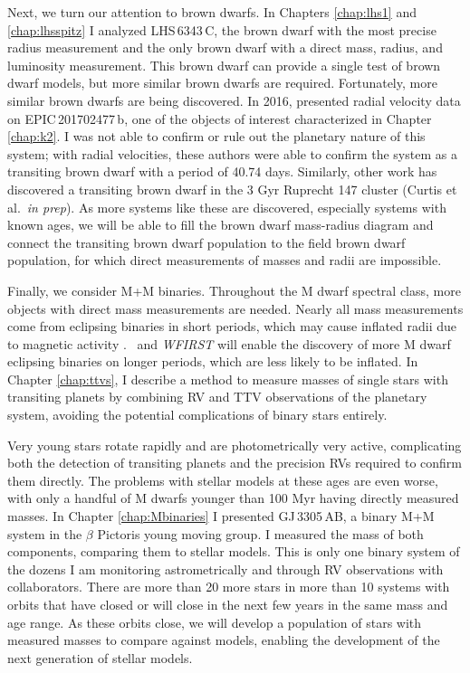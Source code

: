 Next, we turn our attention to brown dwarfs.
In Chapters \ref{chap:lhs1} and \ref{chap:lhsspitz} I analyzed LHS\,6343\,C, the
brown dwarf with the most precise radius measurement and the only brown dwarf with a
direct mass, radius, and luminosity measurement.
This brown dwarf can provide a single test of brown dwarf models, but more similar
brown dwarfs are required.
Fortunately, more similar brown dwarfs are being discovered. 
In 2016, \citet{Bayliss16} presented radial velocity data on EPIC\,201702477\,b,
one of the objects of interest characterized in Chapter \ref{chap:k2}. 
I was not able to confirm or rule out the planetary nature of this system;
with radial velocities, these authors were able to confirm the system as a transiting
brown dwarf with a period of 40.74 days.
Similarly, other work has discovered a transiting brown dwarf in the 3 Gyr Ruprecht 147
cluster (Curtis et al.\ \textit{in prep}). 
As more systems like these are discovered, especially systems with known ages, 
we will be able to fill the brown dwarf mass-radius diagram and connect the transiting
brown dwarf population to the field brown dwarf population, for which direct measurements
of masses and radii are impossible.


Finally, we consider M+M binaries. 
Throughout the M dwarf spectral class, more objects with direct mass measurements are
needed.
Nearly all mass measurements come from eclipsing binaries in short periods, which may
cause inflated radii due to magnetic activity \citep{Chabrier07, Jackson09}.
\KT\ and \textit{WFIRST} will enable the discovery of more M dwarf eclipsing binaries 
on longer periods, which are less likely to be inflated.
In Chapter \ref{chap:ttvs}, I describe a method to measure masses of single stars
with transiting planets by combining RV and TTV observations of the planetary system,
avoiding the potential complications of binary stars entirely.

Very young stars rotate rapidly and are photometrically very active, complicating both
the detection of transiting planets and the precision RVs required to confirm them 
directly.
The problems with stellar models at these ages are even worse, with only a handful of
M dwarfs younger than 100 Myr having directly measured masses.
In Chapter \ref{chap:Mbinaries} I presented GJ\,3305\,AB, a binary M+M system in the
$\beta$ Pictoris young moving group. 
I measured the mass of both components, comparing them to stellar models.
This is only one binary system of the dozens I am monitoring astrometrically and through
RV observations with collaborators. There are more than 20 more stars in more than 
10 systems with orbits that have closed or will close in the next few years in the same
mass and age range.
As these orbits close, we will develop a population of stars with measured masses to
compare against models, enabling the development of the next generation of stellar models.

